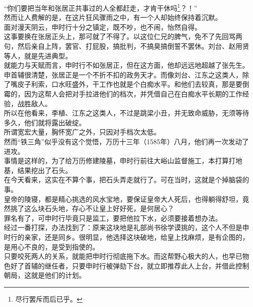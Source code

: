 \begin{multicols}{\theparacolNo}
“你们要把当年和张居正共事过的人全都赶走，才肯干休吗\footnote{尽行罢斥而后已乎。}？！”\\

然而让人费解的是，在这片狂风骤雨之中，有一个人却始终保持着沉默。\\

面对漫天阴云，申时行十分之镇定，既不吵，也不闹，怡然自得。\\

这事要换在张居正头上，那可就了不得了。以这位仁兄的脾气，免不了先回骂两句，然后亲自上阵，罢官、打屁股，搞批判，不搞臭搞倒誓不罢休。刘台、赵用贤等人，就是先进典型。\\

就能力与天赋而言，申时行不如张居正，但在这方面，他却远远地超越了张先生。\\

申首辅很清楚，张居正是一个不折不扣的政务天才。而像刘台、江东之这类人，除了嘴皮子利索，口水旺盛外，干工作也就是个白痴水平。和他们去较真，那是要倒霉的，因为这帮人会把对手拉进他们的档次，并凭借自己在白痴水平长期的工作经验，战胜敌人。\\

所以在他看来，李植、江东之这类人，不过是跳梁小丑，并无致命威胁，无须等待多久，他们就将露出破绽。\\

所谓宽宏大量，胸怀宽广之外，只因对手档次太低。\\

然而“铁三角”似乎没有这个觉悟，万历十三年（1585年）八月，他们再一次发动了进攻。\\

事情是这样的，为了给万历修建陵墓，申时行前往大峪山监督施工，本打算打地基，结果挖出了石头。\\

在今天看来，这实在不算个事，把石头弄走就行了。可在当时，这就是个掉脑袋的事。\\

皇帝的陵寝，都是精心挑选的风水宝地，要保证皇帝大人死后，也得躺得舒坦，竟然挑了这么块石头地，存心不让皇上好好死，是何居心？\\

罪名有了，可申时行毕竟只是监工，要把他拉下水，必须要接着想办法。\\

经过一番打探，办法找到了：原来这块地是礼部尚书徐学谟挑的，这个人不但是申时行的亲家，还是同乡。很明显，他选择这块破地，给皇上找麻烦，是有企图的，是用心不良的，是受到指使的。\\

只要咬死两人的关系，就能把申时行彻底拖下水。而这帮野心极大的人，也早已物色好了首辅的继任者，只要申时行被弹劾下台，就立即推荐此人上台，并借此控制朝局，这就是他们的计划。\\


\end{multicols}

